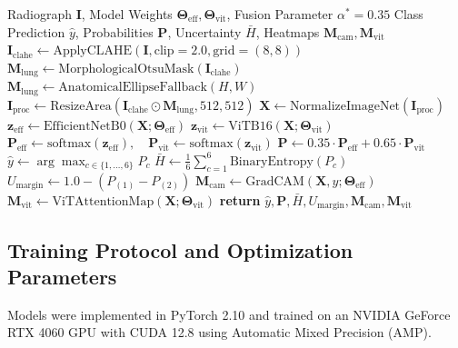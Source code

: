 \documentclass[journal]{IEEEtran}
\begin{document}
\begin{algorithm}[!t]
\caption{End-to-End RESPIRA Inference and Verification Pipeline}
\label{alg:inference}
\begin{algorithmic}[1]
\REQUIRE Radiograph $\mathbf{I}$, Model Weights $\boldsymbol{\Theta}_{\text{eff}}, \boldsymbol{\Theta}_{\text{vit}}$, Fusion Parameter $\alpha^* = 0.35$
\ENSURE Class Prediction $\hat{y}$, Probabilities $\mathbf{P}$, Uncertainty $\bar{H}$, Heatmaps $\mathbf{M}_{\text{cam}}, \mathbf{M}_{\text{vit}}$
\STATE $\mathbf{I}_{\text{clahe}} \leftarrow \text{ApplyCLAHE}(\mathbf{I}, \text{clip}=2.0, \text{grid}=(8,8))$
\STATE $\mathbf{M}_{\text{lung}} \leftarrow \text{MorphologicalOtsuMask}(\mathbf{I}_{\text{clahe}})$
    \STATE $\mathbf{M}_{\text{lung}} \leftarrow \text{AnatomicalEllipseFallback}(H, W)$
\ENDIF
\STATE $\mathbf{I}_{\text{proc}} \leftarrow \text{ResizeArea}(\mathbf{I}_{\text{clahe}} \odot \mathbf{M}_{\text{lung}}, 512, 512)$
\STATE $\mathbf{X} \leftarrow \text{NormalizeImageNet}(\mathbf{I}_{\text{proc}})$
\STATE $\mathbf{z}_{\text{eff}} \leftarrow \text{EfficientNetB0}(\mathbf{X}; \boldsymbol{\Theta}_{\text{eff}})$
\STATE $\mathbf{z}_{\text{vit}} \leftarrow \text{ViTB16}(\mathbf{X}; \boldsymbol{\Theta}_{\text{vit}})$
\STATE $\mathbf{P}_{\text{eff}} \leftarrow \text{softmax}(\mathbf{z}_{\text{eff}}), \quad \mathbf{P}_{\text{vit}} \leftarrow \text{softmax}(\mathbf{z}_{\text{vit}})$
\STATE $\mathbf{P} \leftarrow 0.35 \cdot \mathbf{P}_{\text{eff}} + 0.65 \cdot \mathbf{P}_{\text{vit}}$
\STATE $\hat{y} \leftarrow \arg\max_{c \in \{1,\dots,6\}} P_c$
\STATE $\bar{H} \leftarrow \frac{1}{6}\sum_{c=1}^6 \text{BinaryEntropy}(P_c)$
\STATE $U_{\text{margin}} \leftarrow 1.0 - (P_{(1)} - P_{(2)})$
\STATE $\mathbf{M}_{\text{cam}} \leftarrow \text{GradCAM}(\mathbf{X}, \hat{y}; \boldsymbol{\Theta}_{\text{eff}})$
\STATE $\mathbf{M}_{\text{vit}} \leftarrow \text{ViTAttentionMap}(\mathbf{X}; \boldsymbol{\Theta}_{\text{vit}})$
\STATE \textbf{return} $\hat{y}, \mathbf{P}, \bar{H}, U_{\text{margin}}, \mathbf{M}_{\text{cam}}, \mathbf{M}_{\text{vit}}$
\end{algorithmic}
\end{algorithm}

\subsection{Training Protocol and Optimization Parameters}
\label{subsec:training}

Models were implemented in PyTorch 2.10 and trained on an NVIDIA GeForce RTX 4060 GPU with CUDA 12.8 using Automatic Mixed Precision (AMP).
\end{document}

